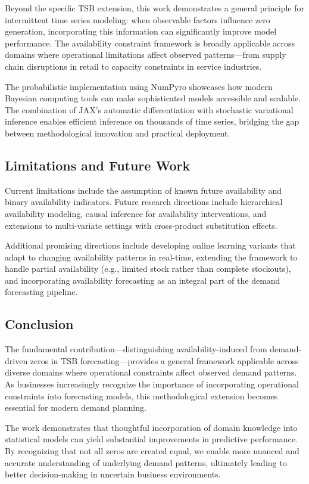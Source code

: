 \documentclass[11pt]{amsart}
\theoremstyle{definition}
\begin{document}
Beyond the specific TSB extension, this work demonstrates a general principle for intermittent time series modeling: 
when observable factors influence zero generation, incorporating this information can significantly improve model 
performance. The availability constraint framework is broadly applicable across domains where operational limitations 
affect observed patterns—from supply chain disruptions in retail to capacity constraints in service industries.

The probabilistic implementation using NumPyro showcases how modern Bayesian computing tools can make sophisticated 
models accessible and scalable. The combination of JAX's automatic differentiation with stochastic variational 
inference enables efficient inference on thousands of time series, bridging the gap between methodological innovation 
and practical deployment.

\subsection{Limitations and Future Work}

Current limitations include the assumption of known future availability and binary availability indicators. Future 
research directions include hierarchical availability modeling, causal inference for availability interventions, 
and extensions to multi-variate settings with cross-product substitution effects.

Additional promising directions include developing online learning variants that adapt to changing availability patterns 
in real-time, extending the framework to handle partial availability (e.g., limited stock rather than complete stockouts), 
and incorporating availability forecasting as an integral part of the demand forecasting pipeline.

\subsection{Conclusion}

The fundamental contribution—distinguishing availability-induced from demand-driven zeros in TSB forecasting—provides 
a general framework applicable across diverse domains where operational constraints affect observed demand patterns. 
As businesses increasingly recognize the importance of incorporating operational constraints into forecasting models, 
this methodological extension becomes essential for modern demand planning.

The work demonstrates that thoughtful incorporation of domain knowledge into statistical models can yield substantial 
improvements in predictive performance. By recognizing that not all zeros are created equal, we enable more nuanced 
and accurate understanding of underlying demand patterns, ultimately leading to better decision-making in uncertain 
business environments.



\end{document}
